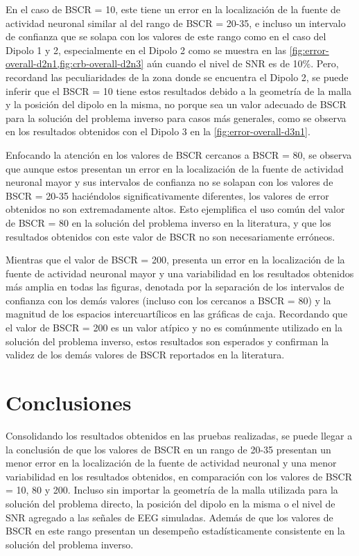 En el caso de BSCR = 10, este tiene un error en la localización de la fuente de actividad neuronal similar al del rango de BSCR = 20-35, e incluso un intervalo de confianza que se solapa con los valores de este rango como en el caso del Dipolo 1 y 2, especialmente en el Dipolo 2 como se muestra en las \cref{fig:error-overall-d2n1,fig:crb-overall-d2n3} aún cuando el nivel de SNR es de 10\%.
Pero, recordand las peculiaridades de la zona donde se encuentra el Dipolo 2, se puede inferir que el BSCR = 10 tiene estos resultados debido a la geometría de la malla y la posición del dipolo en la misma, no porque sea un valor adecuado de BSCR para la solución del problema inverso para casos más generales, como se observa en los resultados obtenidos con el Dipolo 3 en la \cref{fig:error-overall-d3n1}.

Enfocando la atención en los valores de BSCR cercanos a BSCR = 80, se observa que aunque estos presentan un error en la localización de la fuente de actividad neuronal mayor y sus intervalos de confianza no se solapan con los valores de BSCR = 20-35 haciéndolos significativamente diferentes, los valores de error obtenidos no son extremadamente altos.
Esto ejemplifica el uso común del valor de BSCR = 80 en la solución del problema inverso en la literatura, y que los resultados obtenidos con este valor de BSCR no son necesariamente erróneos. 

Mientras que el valor de BSCR = 200, presenta un error en la localización de la fuente de actividad neuronal mayor y una variabilidad en los resultados obtenidos más amplia en todas las figuras, denotada por la separación de los intervalos de confianza con los demás valores (incluso con los cercanos a BSCR = 80) y la magnitud de los espacios intercuartílicos en las gráficas de caja.
Recordando que el valor de BSCR = 200 es un valor atípico y no es comúnmente utilizado en la solución del problema inverso, estos resultados son esperados y confirman la validez de los demás valores de BSCR reportados en la literatura. 

\section{Conclusiones}

Consolidando los resultados obtenidos en las pruebas realizadas, se puede llegar a la conclusión de que los valores de BSCR en un rango de 20-35 presentan un menor error en la localización de la fuente de actividad neuronal y una menor variabilidad en los resultados obtenidos, en comparación con los valores de BSCR = 10, 80 y 200.
Incluso sin importar la geometría de la malla utilizada para la solución del problema directo, la posición del dipolo en la misma o el nivel de SNR agregado a las señales de EEG simuladas.
Además de que los valores de BSCR en este rango presentan un desempeño estadísticamente consistente en la solución del problema inverso.

